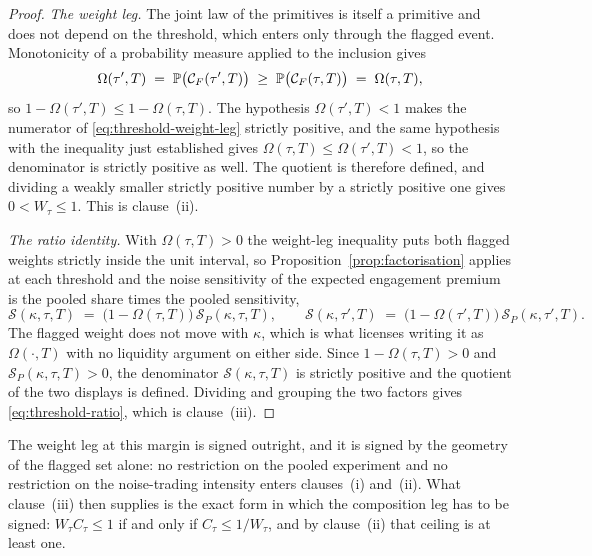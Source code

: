 \begin{proof}
\emph{The weight leg.} The joint law of the primitives is itself a primitive and does not depend on
the threshold, which enters only through the flagged event. Monotonicity of a probability measure
applied to the inclusion gives
\[
\Omega(\tau',T) \;=\; \mathbb{P}\bigl(\mathcal C_F(\tau',T)\bigr)
\;\ge\; \mathbb{P}\bigl(\mathcal C_F(\tau,T)\bigr) \;=\; \Omega(\tau,T),
\]
so $1-\Omega(\tau',T) \le 1-\Omega(\tau,T)$. The hypothesis $\Omega(\tau',T) < 1$ makes the
numerator of \eqref{eq:threshold-weight-leg} strictly positive, and the same hypothesis with the
inequality just established gives $\Omega(\tau,T) \le \Omega(\tau',T) < 1$, so the denominator is
strictly positive as well. The quotient is therefore defined, and dividing a weakly smaller strictly
positive number by a strictly positive one gives $0 < W_\tau \le 1$. This is clause~(ii).

\emph{The ratio identity.} With $\Omega(\tau,T) > 0$ the weight-leg inequality puts
both flagged weights strictly inside the unit interval, so Proposition~\ref{prop:factorisation}
applies at each threshold and the noise sensitivity of the expected engagement premium is the
pooled share times the pooled sensitivity,
\[
\mathcal S(\kappa,\tau,T) \;=\; \bigl(1-\Omega(\tau,T)\bigr)\,\mathcal S_P(\kappa,\tau,T),
\qquad
\mathcal S(\kappa,\tau',T) \;=\; \bigl(1-\Omega(\tau',T)\bigr)\,\mathcal S_P(\kappa,\tau',T) .
\]
The flagged weight does not move with $\kappa$, which is what licenses writing it as
$\Omega(\cdot,T)$ with no liquidity argument on either side. Since $1-\Omega(\tau,T) > 0$ and
$\mathcal S_P(\kappa,\tau,T) > 0$, the denominator $\mathcal S(\kappa,\tau,T)$ is strictly positive
and the quotient of the two displays is defined. Dividing and grouping the two factors gives
\eqref{eq:threshold-ratio}, which is clause~(iii).
\end{proof}

\noindent
The weight leg at this margin is signed outright, and it is signed by the geometry of the flagged
set alone: no restriction on the pooled experiment and no restriction on the noise-trading intensity
enters clauses~(i) and~(ii). What clause~(iii) then supplies is the exact form in which the
composition leg has to be signed: $W_\tau C_\tau \le 1$ if and only if $C_\tau \le 1/W_\tau$, and
by clause~(ii) that ceiling is at least one.


